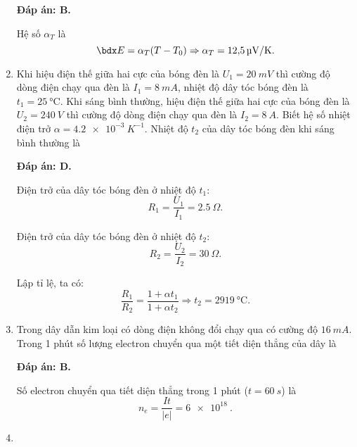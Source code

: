 \begin{enumerate}[label=\bfseries Câu \arabic*:]
{	}
	\loigiai
	{	\textbf{Đáp án: B.}
		
		Hệ số $\alpha_T$ là
		$$\calE = \alpha_T (T - T_0) \Rightarrow \alpha_T = \SI{12.5}{\micro V / K}.$$
	}
	\item {}
	
	\cauhoi
	{Khi hiệu điện thế giữa hai cực của bóng đèn là $U_1 = \SI{20}{mV}$ thì cường độ dòng điện chạy qua đèn là $I_1= \SI{8}{mA}$, nhiệt độ dây tóc bóng đèn là $t_1 = \SI{25}{\celsius}$. Khi sáng bình thường, hiệu điện thế giữa hai cực của bóng đèn là $U_2 = \SI{240}{V}$ thì cường độ dòng điện chạy qua đèn là $I_2 = \SI{8}{A}$. Biết hệ số nhiệt điện trở $\alpha = \SI{4.2e-3}{K^{-1}}$. Nhiệt độ $t_2$ của dây tóc bóng đèn khi sáng bình thường là
		
	}
	\loigiai
	{	\textbf{Đáp án: D.}
		
		Điện trở của dây tóc bóng đèn ở nhiệt độ $t_1$:
		$$R_1 = \dfrac{U_1}{I_1} = \SI{2.5}{\Omega}.$$
		
		Điện trở của dây tóc bóng đèn ở nhiệt độ $t_2$:
		$$R_2 = \dfrac{U_2}{I_2} = \SI{30}{\Omega}.$$
		
		Lập tỉ lệ, ta có:
		$$\dfrac{R_1}{R_2} = \dfrac{1 + \alpha t_1}{1 + \alpha t_2} \Rightarrow t_2 = \SI{2919}{\celsius}.$$
	}
	\item {}
	
	\cauhoi
	{Trong dây dẫn kim loại có dòng điện không đổi chạy qua có cường độ $\SI{16}{mA}$. Trong 1 phút số lượng electron chuyển qua một tiết diện thẳng của dây là
		
	}
	\loigiai
	{	\textbf{Đáp án: B.}
		
		Số electron chuyển qua tiết diện thẳng trong 1 phút ($t=\SI{60}{s}$) là
		$$n_e = \dfrac{It}{|e|} = \SI{6e18}{}.$$
	}
	\item {}
	

\end{enumerate}

